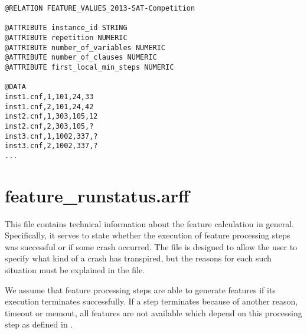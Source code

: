 \begin{lstlisting}[caption=Example feature\_values.arff with three features]
@RELATION FEATURE_VALUES_2013-SAT-Competition

@ATTRIBUTE instance_id STRING
@ATTRIBUTE repetition NUMERIC
@ATTRIBUTE number_of_variables NUMERIC
@ATTRIBUTE number_of_clauses NUMERIC
@ATTRIBUTE first_local_min_steps NUMERIC

@DATA
inst1.cnf,1,101,24,33
inst1.cnf,2,101,24,42
inst2.cnf,1,303,105,12
inst2.cnf,2,303,105,?
inst3.cnf,1,1002,337,?
inst3.cnf,2,1002,337,?
...
\end{lstlisting}


\section{feature\_runstatus.arff}

This file contains technical information about the feature calculation in general. Specifically, it serves to state whether 
the execution of feature processing steps was successful or if some crash occurred. The file is designed to allow the user to
specify what kind of a crash has transpired, but the reasons for each such situation must be explained in the 
 file. 

We assume that feature processing steps are able to generate features if its execution terminates successfully.
If a step terminates because of another reason, \eg{} timeout or memout,   
all features are not available which depend on this processing step as defined in .


